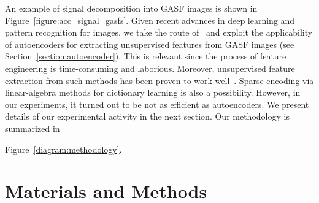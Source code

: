 An example of signal decomposition into GASF images is shown in Figure~\ref{figure:acc_signal_gasfs}. Given recent advances in deep learning and pattern recognition for images, we take the route of~\cite{wang_encoding_2015} and exploit the applicability of autoencoders for extracting unsupervised features from GASF images (see Section~\ref{section:autoencoder}). This is relevant since the process of feature engineering is time-consuming and laborious. Moreover, unsupervised feature extraction from such methods has been proven to work well~\cite{wang_imaging_2015, wang2016time}.
Sparse encoding via linear-algebra methods for dictionary learning is also a possibility. However, in our experiments, it turned out to be not as efficient as autoencoders. We present details of our experimental activity in the next section. Our methodology is summarized in {Figure~\ref{diagram:methodology}.

%
%

\section{Materials and Methods}

}
